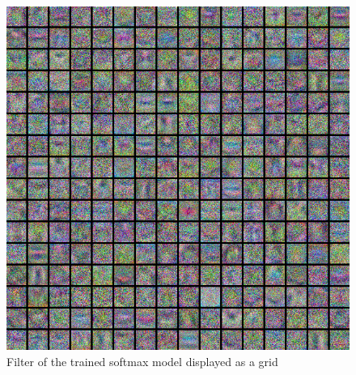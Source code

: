 \begin{figure}[h!]
  \begin{center}
    \includegraphics[width=.7\linewidth]{../code/assignment/2_pytorch/twolayernn_gridfilt.png}
    \caption{Filter of the trained softmax model displayed as a grid}
  \end{center}
\end{figure}
